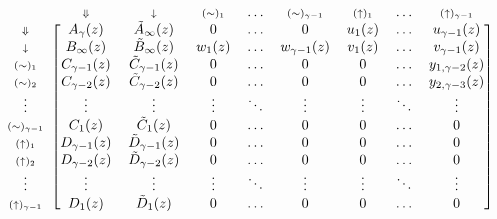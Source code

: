 \documentclass{article}
\newcommand{\DN}{\scriptstyle{\Downarrow}}
\newcommand{\dn}{\scriptstyle{\downarrow}}
\newcommand{\up}[1]{\scriptstyle{(\uparrow)_{#1}}}
\newcommand{\eq}[1]{\scriptstyle{(\sim)_{#1}}}
\begin{document}
\begin{equation*}
\begin{blockarray}{ccccccccc}
   & \DN & \dn &\eq{1} & \ldots & \eq{\gamma-1} &
    \up{1} & \ldots & \up{\gamma-1} \\
\begin{block}{c[cccccccc]}
\DN & A_\gamma(z) & \tilde{A}_\infty(z) & 0 & \ldots & 0 & u_1(z)
    & \ldots & u_{\gamma-1}(z) \\
\dn & B_\infty(z) & \tilde{B}_\infty(z) & w_1(z) & \ldots &
    w_{\gamma-1}(z) & v_1(z) & \ldots & v_{\gamma-1}(z) \\
\eq{1} & C_{\gamma-1}(z) & \tilde{C}_{\gamma-1}(z) & 0 & \ldots & 0 & 0 &
    \ldots & y_{1,\gamma-2}(z) \\
\eq{2} & C_{\gamma-2}(z) & \tilde{C}_{\gamma-2}(z) & 0 & \ldots & 0 & 0 &
    \ldots & y_{2,\gamma-3}(z) \\
\vdots & \vdots & \vdots & \vdots & \ddots & \vdots & \vdots &
    \ddots & \vdots \\
\eq{\gamma-1} & C_1(z) & \tilde{C}_1(z) & 0 & 
    \ldots & 0 & 0 & \ldots & 0 \\
\up{1} & D_{\gamma-1}(z) & \tilde{D}_{\gamma-1}(z) & 0 & \ldots & 0 & 0 &
    \ldots & 0 \\
\up{2} & D_{\gamma-2}(z) & \tilde{D}_{\gamma-2}(z) & 0 & \ldots & 0 & 0 &
    \ldots & 0  \\
\vdots & \vdots & \vdots & \vdots & \ddots & \vdots & \vdots &
    \ddots & \vdots \\
\up{\gamma-1} & D_1(z) & \tilde{D}_1(z) & 0 & \ldots & 0 & 0 &
    \ldots & 0 \\
\end{block}
\end{blockarray}
\end{equation*}
\end{document}
